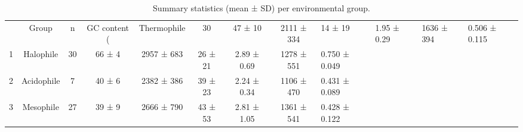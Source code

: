 \begin{table}
\caption{Summary statistics (mean ± SD) per environmental group.}
\label{tab:summary_statistics}
\begin{tabular}{lccccccc}
\toprule
 & Group & n & GC content (%
 & Thermophile & 30 & 47 ± 10 & 2111 ± 334 & 14 ± 19 & 1.95 ± 0.29 & 1636 ± 394 & 0.506 ± 0.115 \\
1 & Halophile & 30 & 66 ± 4 & 2957 ± 683 & 26 ± 21 & 2.89 ± 0.69 & 1278 ± 551 & 0.750 ± 0.049 \\
2 & Acidophile & 7 & 40 ± 6 & 2382 ± 386 & 39 ± 23 & 2.24 ± 0.34 & 1106 ± 470 & 0.431 ± 0.089 \\
3 & Mesophile & 27 & 39 ± 9 & 2666 ± 790 & 43 ± 53 & 2.81 ± 1.05 & 1361 ± 541 & 0.428 ± 0.122 \\
\bottomrule
\end{tabular}
\end{table}
